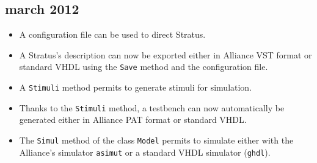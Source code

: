     \subsection{march 2012}

\begin{itemize}
   \item{A configuration file can be used to direct Stratus.}
   \item{A Stratus's description can now be exported either in Alliance VST format or standard VHDL using the \verb-Save- method and the configuration file.}
   \item{A \verb-Stimuli- method permits to generate stimuli for simulation.}
   \item{Thanks to the \verb-Stimuli- method, a testbench can now automatically be generated either in Alliance PAT format or standard VHDL.}
   \item{The \verb-Simul- method of the class \verb-Model- permits to simulate either with the Alliance's simulator \verb-asimut- or a standard VHDL simulator (\verb-ghdl-).}
\end{itemize}


